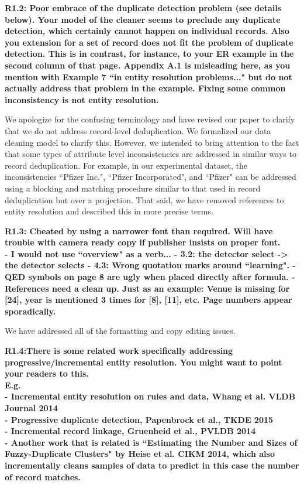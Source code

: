 \vspace{0.5em}

\noindent\textbf{R1.2: Poor embrace of the duplicate detection problem (see details below). Your model of the cleaner seems to preclude any duplicate detection, which certainly cannot happen on individual records. Also you extension for a set of record does not fit the problem of duplicate detection. This is in contrast, for instance, to your ER example in the second column of that page. Appendix A.1 is misleading here, as you mention with Example 7 ``in entity resolution problems..." but do not actually address that problem in the example. Fixing some common inconsistency is not entity resolution.}

We apologize for the confusing terminology and have revised our paper to clarify that we do not address record-level deduplication.
We formalized our data cleaning model to clarify this.
However, we intended to bring attention to the fact that some types of attribute level inconsistencies are addressed in similar ways to record deduplication.
For example, in our experimental dataset, the inconsistencies ``Pfizer Inc.", ``Pfizer Incorporated", and ``Pfizer" can be addressed using a blocking and matching procedure similar to that used in record deduplication but over a projection.
That said, we have removed references to entity resolution and described this in more precise terms.

\vspace{0.5em}

\noindent\textbf{R1.3: Cheated by using a narrower font than required. Will have trouble with camera ready copy if publisher insists on proper font.\\
- I would not use ``overview" as a verb...
- 3.2: the detector select -> the detector selects
- 4.3: Wrong quotation marks around ``learning".
- QED symbols on page 8 are ugly when placed directly after formula. 
- References need a clean up. Just as an example: Venue is missing for [24], year is mentioned 3 times for [8], [11], etc. Page numbers appear sporadically.}

We have addressed all of the formatting and copy editing issues.

\vspace{0.5em}

\noindent\textbf{R1.4:There is some related work specifically addressing progressive/incremental entity resolution. You might want to point your readers to this.
\\E.g.
\\- Incremental entity resolution on rules and data, Whang et al. VLDB Journal 2014
\\- Progressive duplicate detection, Papenbrock et al., TKDE 2015
\\- Incremental record linkage, Gruenheid et al., PVLDB 2014
\\- Another work that is related is ``Estimating the Number and Sizes of Fuzzy-Duplicate Clusters" by Heise et al. CIKM 2014, which also incrementally cleans samples of data to predict in this case the number of record matches.}

